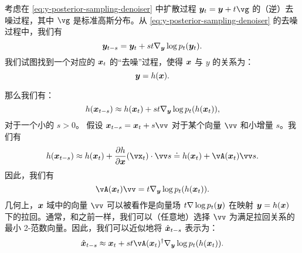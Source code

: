\documentclass[../../book-main_zh.tex]{subfiles}
\begin{document}
考虑在 \eqref{eq:y-posterior-sampling-denoiser} 中扩散过程 $\y_t = \y + t\vg $ 的（逆）去噪过程，其中 $\vg$ 是标准高斯分布。从 \eqref{eq:y-posterior-sampling-denoiser} 的去噪过程中，我们有
\begin{equation}
    \bm{y}_{t-s} =  \bm{y}_t + st \nabla_{\bm{y}} \log p_t(\bm{y}_t).
\end{equation}
我们试图找到一个对应的 $\bm{x}_t$ 的“去噪”过程，使得 $\bm{x}$ 与 $y$ 的关系为：
\begin{equation}
    \bm{y} =  h(\bm{x}).
\end{equation}

那么我们有：
\begin{equation}
    h(\bm{x}_{t-s}) \approx  h(\bm{x}_t) + st \nabla_{\bm{y}} \log p_t(h(\bm{x}_t)),
\end{equation}
对于一个小的 $s >0$。
假设 $\x_{t-s} = \x_t + s \vv$ 对于某个向量 $\vv$ 和小增量 $s$。我们有
\begin{equation}
    h(\x_{t-s}) \approx h(\x_t) + \frac{\partial h}{\partial \x}(\vx_{t}) \cdot \vv s \doteq h(\x_t) + \vA(\x_t) \vv s. 
\end{equation}
因此，我们有
\begin{equation}
    \vA(\x_t) \vv = t \nabla_{\y} \log p_t(h(\x_t)).
    \label{eqn:pushforward}
\end{equation}
几何上，$\bm{x}$ 域中的向量 $\vv$ 可以被看作是向量场 $t \nabla \log p_t(\bm{y})$ 在映射 $\bm{y} = h(\bm{x})$ 下的拉回。通常，和之前一样，我们可以（任意地）选择 $\vv$ 为满足拉回关系的最小 2-范数向量。因此，我们可以近似地将 $\hat{\bm{x}}_{t-s}$ 表示为：
\begin{equation}
    \hat{\x}_{t-s} \approx \x_t + st\vA(\x_t)^\dagger \nabla_{\y} \log p_t(h(\x_t)). 
\label{eqn:pullback-denoise}
\end{equation}
\end{document}
